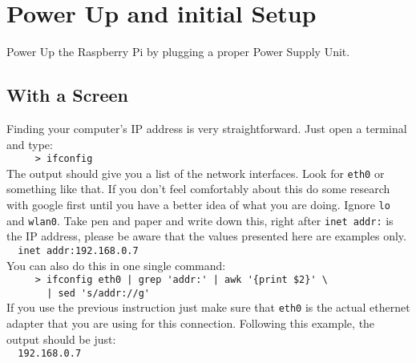   \section{Power Up and initial Setup}
  
  Power Up the Raspberry Pi by plugging a proper Power Supply Unit.
  
  \subsection{With a Screen}
    Finding your computer's IP address is very straightforward. Just open a terminal and type:\\
    \verb=     > ifconfig=\\
    The output should give you a list of the network interfaces. Look for \verb=eth0= or something like that. If you don't feel comfortably about this
    do some research with google first until you have a better idea of what you are doing. Ignore \verb=lo= and \verb=wlan0=. 
    Take pen and paper and write down this, right after \verb=inet addr:= is the IP address, please be aware that the values 
    presented here are examples only.\\
    \verb=	inet addr:192.168.0.7=\\
    You can also do this in one single command:\\
    \verb=     > ifconfig eth0 | grep 'addr:' | awk '{print $2}' \=\\
    \verb=       | sed 's/addr://g'=\\    
    If you use the previous instruction just make sure that \verb=eth0= is the actual ethernet adapter that you are using for this connection. Following 
    this example, the output should be just:\\
    \verb=	192.168.0.7=\\
